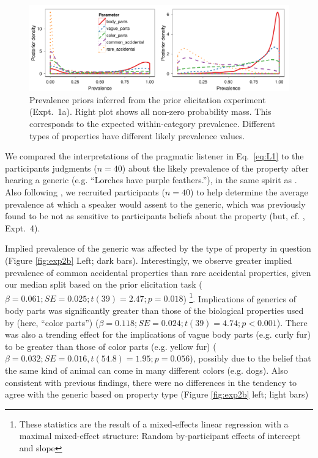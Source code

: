 \documentclass[10pt,letterpaper]{article}
\begin{document}
\begin{figure}
\centering
    \includegraphics[width=\columnwidth]{prior2_prevalenceprior-50kx3.pdf}
    \caption{Prevalence priors inferred from the prior elicitation experiment  (Expt.~1a). Right plot shows all non-zero probability mass. This corresponds to the expected within-category prevalence. Different types of properties have different likely prevalence values.}
  \label{fig:prior2}
\end{figure}

We compared the interpretations of the pragmatic listener in Eq.~\ref{eq:L1} to the participants judgments ($n=40$) about the likely prevalence of the property after hearing a generic (e.g. ``Lorches have purple feathers.''), in the same spirit as . Also following , we recruited participants ($n=40$) to help determine the average prevalence at which a speaker would assent to the generic, which was previously found to be not as sensitive to participants beliefs about the property (but, cf. , Expt.~4).

Implied prevalence of the generic was affected by the type of property in question (Figure \ref{fig:exp2b} Left; dark bars). 
Interestingly, we observe greater implied prevalence of common accidental properties than rare accidental properties, given our median split based on the prior elicitation task ($\beta=0.061; SE = 0.025; t(39) = 2.47; p = 0.018$) \footnote{These statistics are the result of a mixed-effects linear regression with a maximal mixed-effect structure: Random by-participant effects of intercept and slope}.
Implications of generics of body parts was significantly greater than those of the biological properties used by  (here, ``color parts'') ($\beta=0.118; SE = 0.024; t(39) = 4.74; p < 0.001$).
There was also a trending effect for the implications of vague body parts (e.g. curly fur) to be greater than those of color parts (e.g. yellow fur) ($\beta=0.032; SE = 0.016, t(54.8) = 1.95; p = 0.056$), possibly due to the belief that the same kind of animal can come in many different colors (e.g. dogs).
Also consistent with previous findings, there were no differences in the tendency to agree with the generic based on property type (Figure \ref{fig:exp2b} left; light bars)
\end{document}
